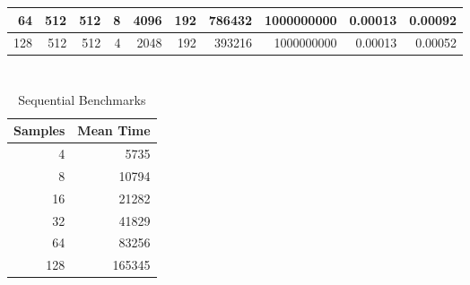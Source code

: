 \documentclass[journal,transmag]{IEEEtran}
\begin{document}
\begin{table}[h]
\begin{tabular}{|r|r|r|r|r|r|r|r|r|r|}
		64                          & 512                        & 512                         & 8                               & 4096                                 & 192                                  & 786432                                 & 1000000000                            & 0.00013                         & 0.00092                       \\ \hline
		128                         & 512                        & 512                         & 4                               & 2048                                 & 192                                  & 393216                                 & 1000000000                            & 0.00013                         & 0.00052                       \\ \hline
	\end{tabular}
\end{table}

\section{}
	\begin{table}[h]
		\centering
		\caption{Sequential Benchmarks}
		\label{table_seq_data}
		\begin{tabular}{|r|r|}
			\hline
			\multicolumn{1}{|l|}{Samples} & \multicolumn{1}{l|}{Mean Time} \\ \hline
			4                             & 5735                           \\ \hline
			8                             & 10794                          \\ \hline
			16                            & 21282                          \\ \hline
			32                            & 41829                          \\ \hline
			64                            & 83256                          \\ \hline
			128                           & 165345                         \\ \hline
		\end{tabular}
	\end{table}
	\newpage
	
\end{document}
